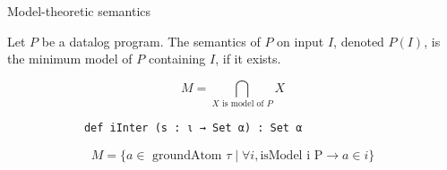 \documentclass{beamer}
\begin{document}
    \begin{frame}[fragile]{Model-theoretic semantics}
      \begin{definition}
        Let $P$ be a datalog program. \textelp{} The semantics of $P$ on input $I$, denoted
        $P (I)$, is the minimum model of $P$ containing $I$, if it exists.
      \end{definition}

      \pause
      \[M = \bigcap_{X \text{ is model of } P}  X \]
      \pause

      \begin{lstlisting}
            def iInter (s : ι → Set α) : Set α
      \end{lstlisting}
      \pause

      \[ M = \{a \in \text{ groundAtom } \tau \mid \forall i, \text{isModel i P} \rightarrow a \in i\} \]
    \end{frame}
\end{document}
